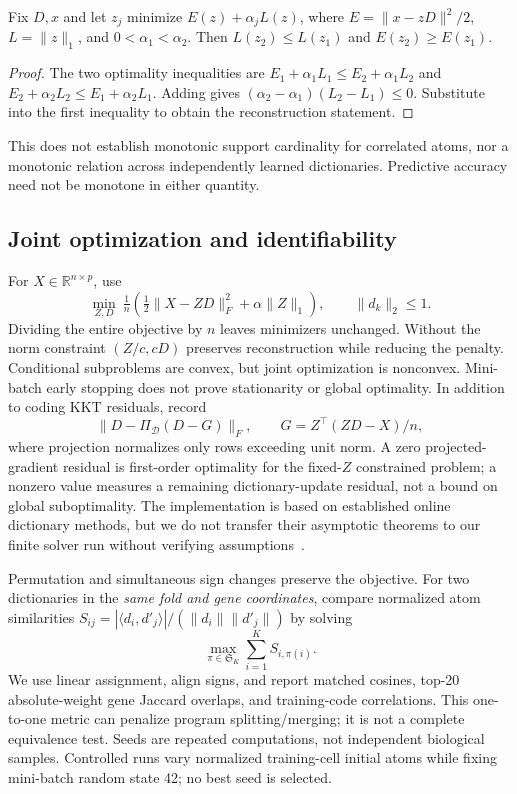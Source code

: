 \begin{proposition}
Fix $D,x$ and let $z_j$ minimize $E(z)+\alpha_jL(z)$, where $E=\|x-zD\|^2/2$, $L=\|z\|_1$, and $0<\alpha_1<\alpha_2$. Then $L(z_2)\le L(z_1)$ and $E(z_2)\ge E(z_1)$.
\end{proposition}
\begin{proof}
The two optimality inequalities are
$E_1+\alpha_1L_1\le E_2+\alpha_1L_2$ and
$E_2+\alpha_2L_2\le E_1+\alpha_2L_1$.
Adding gives $(\alpha_2-\alpha_1)(L_2-L_1)\le0$. Substitute into the first inequality to obtain the reconstruction statement.
\end{proof}
This does not establish monotonic support cardinality for correlated atoms, nor a monotonic relation across independently learned dictionaries. Predictive accuracy need not be monotone in either quantity.

\subsection{Joint optimization and identifiability}
For $X\in\mathbb R^{n\times p}$, use
\[
 \min_{Z,D}\ \tfrac1n\left(\tfrac12\|X-ZD\|_F^2+\alpha\|Z\|_1\right),
 \qquad\|d_k\|_2\le1.
\]
Dividing the entire objective by $n$ leaves minimizers unchanged. Without the norm constraint $(Z/c,cD)$ preserves reconstruction while reducing the penalty. Conditional subproblems are convex, but joint optimization is nonconvex. Mini-batch early stopping does not prove stationarity or global optimality. In addition to coding KKT residuals, record
\[
 \|D-\Pi_{\mathcal D}(D-G)\|_F,\qquad
 G=Z^\top(ZD-X)/n,
\]
where projection normalizes only rows exceeding unit norm. A zero projected-gradient residual is first-order optimality for the fixed-$Z$ constrained problem; a nonzero value measures a remaining dictionary-update residual, not a bound on global suboptimality. The implementation is based on established online dictionary methods, but we do not transfer their asymptotic theorems to our finite solver run without verifying assumptions~\cite{mairal2010}.

Permutation and simultaneous sign changes preserve the objective. For two dictionaries in the \emph{same fold and gene coordinates}, compare normalized atom similarities $S_{ij}=|\langle d_i,d'_j\rangle|/(\|d_i\|\|d'_j\|)$ by solving
\[
 \max_{\pi\in\mathfrak S_K}\sum_{i=1}^K S_{i,\pi(i)}.
\]
We use linear assignment, align signs, and report matched cosines, top-20 absolute-weight gene Jaccard overlaps, and training-code correlations. This one-to-one metric can penalize program splitting/merging; it is not a complete equivalence test. Seeds are repeated computations, not independent biological samples. Controlled runs vary normalized training-cell initial atoms while fixing mini-batch random state 42; no best seed is selected.

